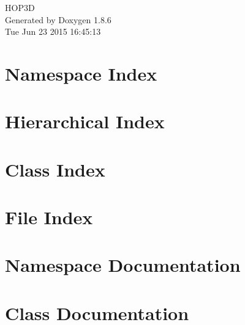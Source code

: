 \documentclass[twoside]{book}
\newcommand{\clearemptydoublepage}{%
  \newpage{\pagestyle{empty}\cleardoublepage}%
}
\begin{document}
\hypersetup{pageanchor=false}
\begin{titlepage}
\vspace*{7cm}
\begin{center}%
{\Large H\-O\-P3\-D }\\
\vspace*{1cm}
{\large Generated by Doxygen 1.8.6}\\
\vspace*{0.5cm}
{\small Tue Jun 23 2015 16:45:13}\\
\end{center}
\end{titlepage}
\clearemptydoublepage
\tableofcontents
\clearemptydoublepage
{}
\hypersetup{pageanchor=true}

\chapter{Namespace Index}

\chapter{Hierarchical Index}

\chapter{Class Index}

\chapter{File Index}

\chapter{Namespace Documentation}

\chapter{Class Documentation}















\end{document}
